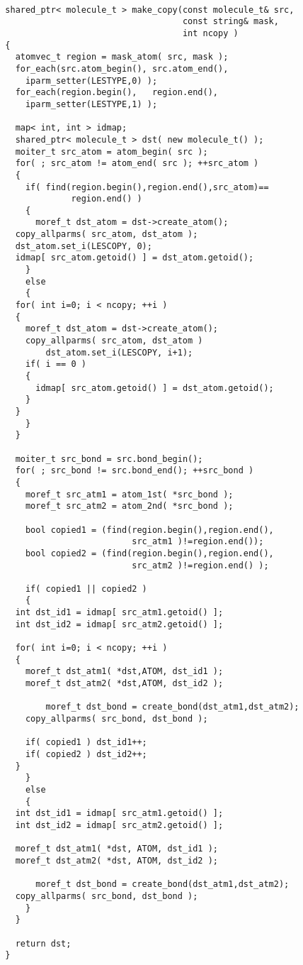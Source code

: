 \documentclass[letterpaper]{book}
\begin{document}
\begin{lstlisting}

  shared_ptr< molecule_t > make_copy(const molecule_t& src, 
                                     const string& mask, 
                                     int ncopy )
  {
    atomvec_t region = mask_atom( src, mask );
    for_each(src.atom_begin(), src.atom_end(), 
      iparm_setter(LESTYPE,0) );
    for_each(region.begin(),   region.end(),   
      iparm_setter(LESTYPE,1) );

    map< int, int > idmap;
    shared_ptr< molecule_t > dst( new molecule_t() );
    moiter_t src_atom = atom_begin( src );
    for( ; src_atom != atom_end( src ); ++src_atom )
    {
      if( find(region.begin(),region.end(),src_atom)==
               region.end() )
      {
        moref_t dst_atom = dst->create_atom();
	copy_allparms( src_atom, dst_atom );
	dst_atom.set_i(LESCOPY, 0);
	idmap[ src_atom.getoid() ] = dst_atom.getoid();
      }
      else
      {
	for( int i=0; i < ncopy; ++i )
	{
	  moref_t dst_atom = dst->create_atom();
	  copy_allparms( src_atom, dst_atom )
          dst_atom.set_i(LESCOPY, i+1);
	  if( i == 0 ) 
	  {
	    idmap[ src_atom.getoid() ] = dst_atom.getoid();
	  }
	}
      }
    }

    moiter_t src_bond = src.bond_begin();
    for( ; src_bond != src.bond_end(); ++src_bond )
    {
      moref_t src_atm1 = atom_1st( *src_bond );
      moref_t src_atm2 = atom_2nd( *src_bond );

      bool copied1 = (find(region.begin(),region.end(),
                           src_atm1 )!=region.end());
      bool copied2 = (find(region.begin(),region.end(),
                           src_atm2 )!=region.end() );

      if( copied1 || copied2 )
      {
	int dst_id1 = idmap[ src_atm1.getoid() ];
	int dst_id2 = idmap[ src_atm2.getoid() ];

	for( int i=0; i < ncopy; ++i )
	{
	  moref_t dst_atm1( *dst,ATOM, dst_id1 );
	  moref_t dst_atm2( *dst,ATOM, dst_id2 );

          moref_t dst_bond = create_bond(dst_atm1,dst_atm2);
	  copy_allparms( src_bond, dst_bond );
			
	  if( copied1 ) dst_id1++;
	  if( copied2 ) dst_id2++;
	}
      }
      else
      {
	int dst_id1 = idmap[ src_atm1.getoid() ];
	int dst_id2 = idmap[ src_atm2.getoid() ];

	moref_t dst_atm1( *dst, ATOM, dst_id1 );
	moref_t dst_atm2( *dst, ATOM, dst_id2 );

        moref_t dst_bond = create_bond(dst_atm1,dst_atm2);
	copy_allparms( src_bond, dst_bond );
      }
    }
      
    return dst;
  }

\end{lstlisting}
\end{document}
